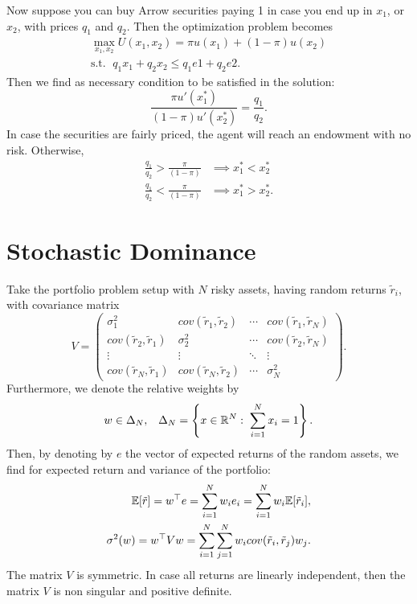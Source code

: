\documentclass[twoside]{article}
\begin{document}
Now suppose you can buy Arrow securities paying 1 in case you end up in $x_1$, or $x_2$, with prices $q_1$ and $q_2$. Then the optimization problem becomes
\begin{align*}
    \max_{x_1, x_2} U(x_1, x_2) = \pi u(x_1) + (1-\pi)u(x_2) \\
    \text{s.t. } \; q_1x_1 + q_2x_2 \leq q_1e1 + q_2e2.
\end{align*}
Then we find as necessary condition to be satisfied in the solution:
\[
    \frac{\pi u'(x^*_1)}{(1-\pi)u'(x^*_2)} = \frac{q_1}{q_2}.
\]
In case the securities are fairly priced, the agent will reach an endowment with no risk. Otherwise,
\begin{align*}
    \frac{q_1}{q_2} > \frac{\pi}{(1-\pi)} & \implies x^*_1 < x^*_2 \\
    \frac{q_1}{q_2} < \frac{\pi}{(1-\pi)} & \implies x^*_1 > x^*_2.
\end{align*}


\section{Stochastic Dominance}
Take the portfolio problem setup with $N$ risky assets, having random returns $\tilde{r}_i$, with covariance matrix
\[
    V = \begin{pmatrix}
        \sigma^2_1  & cov(\tilde{r}_1, \tilde{r}_2) & \cdots & cov(\tilde{r}_1, \tilde{r}_N) \\
        cov(\tilde{r}_2, \tilde{r}_1) & \sigma^2_2 & \cdots & cov(\tilde{r}_2, \tilde{r}_N) \\
        \vdots & \vdots & \ddots & \vdots \\
        cov(\tilde{r}_N, \tilde{r}_1) & cov(\tilde{r}_N, \tilde{r}_2) & \cdots & \sigma^2_N
    \end{pmatrix}.
\]
Furthermore, we denote the relative weights by
\[
    w \in \Delta_N, \;\;\; \Delta_N = \left\{x \in \mathbb{R}^N  : \; \sum_{i=1}^N x_i = 1\right\}.
\]
Then, by denoting by $e$ the vector of expected returns of the random assets, we find for expected return and variance of the portfolio:
\begin{align*}
    \mathbb{E}[\tilde{r}] = w^\top e = \sum^N_{i=1}w_ie_i = \sum^N_{i=1}w_i\mathbb{E}[\tilde{r}_i], \\
    \sigma^2(w) = w^\top V w = \sum^N_{i=1}\sum^N_{j=1}w_icov(\tilde{r}_i, \tilde{r}_j)w_j.
\end{align*}
The matrix $V$ is symmetric. In case all returns are linearly independent, then the matrix $V$ is non singular and positive definite.
\end{document}
